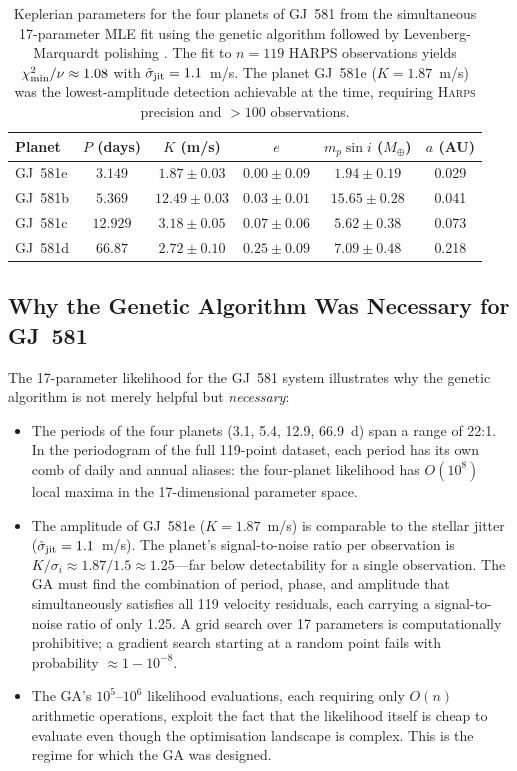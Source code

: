 \documentclass[12pt]{article}
\begin{document}
\begin{table}[ht]
\centering
\caption{Keplerian parameters for the four planets of GJ~581 from the
simultaneous 17-parameter MLE fit using the genetic algorithm followed
by Levenberg-Marquardt polishing \citep{Mayor2009}.  The fit to
$n = 119$ HARPS observations yields $\chi^2_{\rm min}/\nu \approx 1.08$
with $\hat\sigma_{\rm jit} = 1.1$~m/s.  The planet GJ~581e
($K = 1.87$~m/s) was the lowest-amplitude detection achievable at the
time, requiring \textsc{Harps} precision and $>100$ observations.}
\label{tab:gj581}
\medskip
\begin{tabular}{lccccc}
\toprule
Planet & $P$ (days) & $K$ (m/s) & $e$ & $m_p\sin i$ ($M_\oplus$)
  & $a$ (AU) \\
\midrule
GJ~581e & $3.149$  & $1.87\pm0.03$ & $0.00\pm0.09$ &  $1.94\pm0.19$ & 0.029 \\
GJ~581b & $5.369$  & $12.49\pm0.03$& $0.03\pm0.01$ & $15.65\pm0.28$ & 0.041 \\
GJ~581c & $12.929$ & $3.18\pm0.05$ & $0.07\pm0.06$ &  $5.62\pm0.38$ & 0.073 \\
GJ~581d & $66.87$  & $2.72\pm0.10$ & $0.25\pm0.09$ &  $7.09\pm0.48$ & 0.218 \\
\bottomrule
\end{tabular}
\end{table}

\subsection{Why the Genetic Algorithm Was Necessary for GJ~581}

The 17-parameter likelihood for the GJ~581 system illustrates why the
genetic algorithm is not merely helpful but \emph{necessary}:
\begin{itemize}
  \item The periods of the four planets (3.1, 5.4, 12.9, 66.9~d) span a
    range of 22:1.  In the periodogram of the full 119-point dataset,
    each period has its own comb of daily and annual aliases: the
    four-planet likelihood has $O(10^8)$ local maxima in the 17-dimensional
    parameter space.
  \item The amplitude of GJ~581e ($K = 1.87$~m/s) is comparable to
    the stellar jitter ($\hat\sigma_{\rm jit} = 1.1$~m/s).  The
    planet's signal-to-noise ratio per observation is $K/\sigma_i
    \approx 1.87/1.5 \approx 1.25$---far below detectability for a
    single observation.  The GA must find the combination of period,
    phase, and amplitude that simultaneously satisfies all 119 velocity
    residuals, each carrying a signal-to-noise ratio of only 1.25.
    A grid search over 17 parameters is computationally prohibitive;
    a gradient search starting at a random point fails with probability
    $\approx 1 - 10^{-8}$.
  \item The GA's $10^5$--$10^6$ likelihood evaluations, each requiring
    only $O(n)$ arithmetic operations, exploit the fact that the likelihood
    itself is cheap to evaluate even though the optimisation landscape
    is complex.  This is the regime for which the GA was designed.
\end{itemize}
\end{document}

